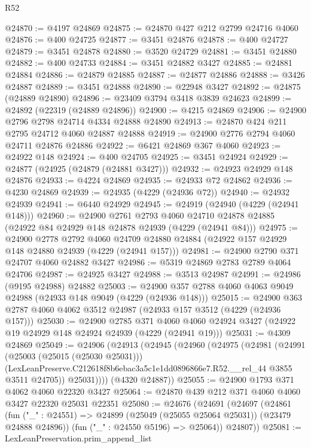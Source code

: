 \begin{lexlean}{R52}
\begin{coremodule}
@24870 := @4197 @24869
@24875 := @24870 @427 @212 @2799 @24716 @4060
@24876 := @400 @24725
@24877 := @3451 @24876
@24878 := @400 @24727
@24879 := @3451 @24878
@24880 := @3520 @24729
@24881 := @3451 @24880
@24882 := @400 @24733
@24884 := @3451 @24882 @3427
@24885 := @24881 @24884
@24886 := @24879 @24885
@24887 := @24877 @24886
@24888 := @3426 @24887
@24889 := @3451 @24888
@24890 := @22948 @3427
@24892 := @24875 (@24889 @24890)
@24896 := @23409 @3794 @3418 @3839 @24623
@24899 := @24892 (@22319 (@24889 @24896))
@24900 := @4215 @24869
@24906 := @24900 @2796 @2798 @24714 @4334 @24888 @24890
@24913 := @24870 @424 @211 @2795 @24712 @4060 @24887 @24888
@24919 := @24900 @2776 @2794 @4060 @24711 @24876 @24886
@24922 := @6421 @24869 @367 @4060
@24923 := @24922 @148
@24924 := @400 @24705
@24925 := @3451 @24924
@24929 := @24877 (@24925 (@24879 (@24881 @3427)))
@24932 := @24923 @24929 @148 @24876
@24933 := @4224 @24869
@24935 := @24933 @72 @24862
@24936 := @4230 @24869
@24939 := @24935 (@4229 (@24936 @72))
@24940 := @24932 @24939
@24941 := @6440 @24929
@24945 := @24919 (@24940 (@4229 (@24941 @148)))
@24960 := @24900
    @2761
    @2793
    @4060
    @24710
    @24878
    @24885
    (@24922 @84 @24929 @148 @24878 @24939 (@4229 (@24941 @84)))
@24975 := @24900
    @2778
    @2792
    @4060
    @24709
    @24880
    @24884
    (@24922 @157 @24929 @148 @24880 @24939 (@4229 (@24941 @157)))
@24981 := @24900 @2790 @371 @24707 @4060 @24882 @3427
@24986 := @5319 @24869 @2783 @2789 @4064 @24706
@24987 := @24925 @3427
@24988 := @3513 @24987
@24991 := @24986 (@9195 @24988) @24882
@25003 := @24900 @357 @2788 @4060 @4063 @9049 @24988 (@24933 @148 @9049 (@4229 (@24936 @148)))
@25015 := @24900 @363 @2787 @4060 @4062 @3512 @24987 (@24933 @157 @3512 (@4229 (@24936 @157)))
@25030 := @24900
    @2785
    @371
    @4060
    @4060
    @24924
    @3427
    (@24922 @19 @24929 @148 @24924 @24939 (@4229 (@24941 @19)))
@25031 := @4309 @24869
@25049 := @24906
    (@24913
      (@24945
        (@24960
          (@24975
            (@24981
              (@24991
                (@25003 (@25015 (@25030 @25031)))
                (LexLeanPreserve.C212618f8b6ebac3a5c1e1dd0896866e7.R52.__rel_44 @3855 @3511 @24705))
              @25031))))
      (@4320 @24887))
@25055 := @24900 @1793 @371 @4062 @4060 @22320 @3427
@25064 := @24870 @439 @212 @371 @4060 @4060 @3427 @22320 @25031 @22351
@25080 := @24676
    (@24691
      (@24697
        (@24861
          (fun ("_" : @24551) => @24899 (@25049 (@25055 @25064 @25031)) (@23479 @24888 @24896))
          (fun ("_" : @24550 @5196) => @25064))
        @24807))
@25081 := LexLeanPreservation.prim_append_list

\end{coremodule}
\end{lexlean}

